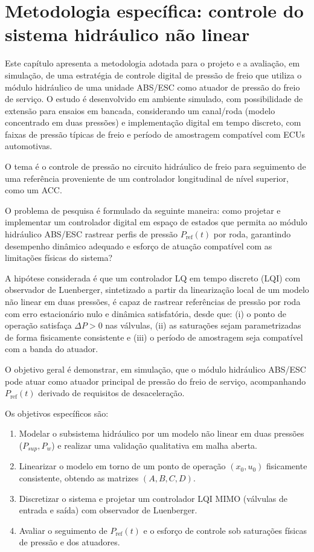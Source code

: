 \chapter{Metodologia específica: controle do sistema hidráulico não linear}
\label{cap:controle}

Este capítulo apresenta a metodologia adotada para o projeto e a avaliação, em simulação, de uma estratégia de controle digital de pressão de freio que utiliza o módulo hidráulico de uma unidade ABS/ESC como atuador de pressão do freio de serviço. O estudo é desenvolvido em ambiente simulado, com possibilidade de extensão para ensaios em bancada, considerando um canal/roda (modelo concentrado em duas pressões) e implementação digital em tempo discreto, com faixas de pressão típicas de freio e período de amostragem compatível com ECUs automotivas.

O tema é o controle de pressão no circuito hidráulico de freio para seguimento de uma referência proveniente de um controlador longitudinal de nível superior, como um ACC.

O problema de pesquisa é formulado da seguinte maneira: como projetar e implementar um controlador digital em espaço de estados que permita ao módulo hidráulico ABS/ESC rastrear perfis de pressão $P_{\mathrm{ref}}(t)$ por roda, garantindo desempenho dinâmico adequado e esforço de atuação compatível com as limitações físicas do sistema?

A hipótese considerada é que um controlador LQ em tempo discreto (LQI) com observador de Luenberger, sintetizado a partir da linearização local de um modelo não linear em duas pressões, é capaz de rastrear referências de pressão por roda com erro estacionário nulo e dinâmica satisfatória, desde que: (i) o ponto de operação satisfaça $\Delta P>0$ nas válvulas, (ii) as saturações sejam parametrizadas de forma fisicamente consistente e (iii) o período de amostragem seja compatível com a banda do atuador.

O objetivo geral é demonstrar, em simulação, que o módulo hidráulico ABS/ESC pode atuar como atuador principal de pressão do freio de serviço, acompanhando $P_{\mathrm{ref}}(t)$ derivado de requisitos de desaceleração.

Os objetivos específicos são:
\begin{enumerate}
    \item Modelar o subsistema hidráulico por um modelo não linear em duas pressões ($P_{sup},P_w$) e realizar uma validação qualitativa em malha aberta.
    \item Linearizar o modelo em torno de um ponto de operação $(x_0,u_0)$ fisicamente consistente, obtendo as matrizes $(A,B,C,D)$.
    \item Discretizar o sistema e projetar um controlador LQI MIMO (válvulas de entrada e saída) com observador de Luenberger.
    \item Avaliar o seguimento de $P_{\mathrm{ref}}(t)$ e o esforço de controle sob saturações físicas de pressão e dos atuadores.
\end{enumerate}


